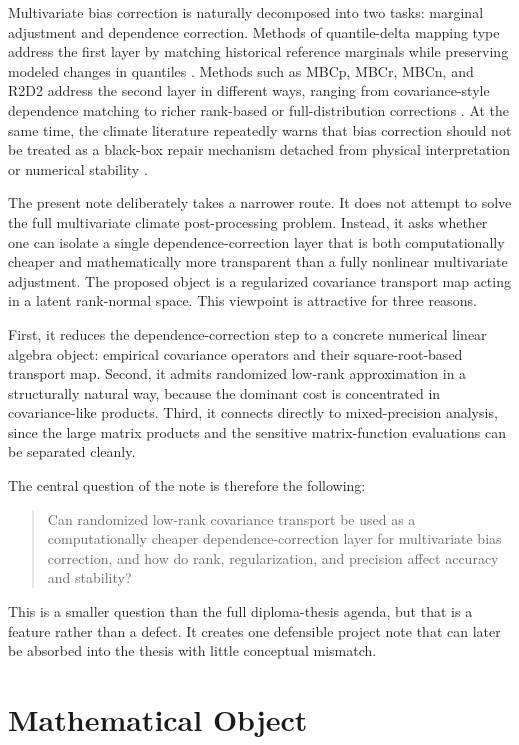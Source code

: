 \documentclass[12pt,a4paper]{article}
\begin{document}
Multivariate bias correction is naturally decomposed into two tasks: marginal adjustment and dependence correction. Methods of quantile-delta mapping type address the first layer by matching historical reference marginals while preserving modeled changes in quantiles \cite{cannon2015qdm}. Methods such as MBCp, MBCr, MBCn, and R2D2 address the second layer in different ways, ranging from covariance-style dependence matching to richer rank-based or full-distribution corrections \cite{cannon2016mbc,cannon2018mbcn,vrac2018r2d2}. At the same time, the climate literature repeatedly warns that bias correction should not be treated as a black-box repair mechanism detached from physical interpretation or numerical stability \cite{maraun2016biasreview}.

The present note deliberately takes a narrower route. It does not attempt to solve the full multivariate climate post-processing problem. Instead, it asks whether one can isolate a single dependence-correction layer that is both computationally cheaper and mathematically more transparent than a fully nonlinear multivariate adjustment. The proposed object is a regularized covariance transport map acting in a latent rank-normal space. This viewpoint is attractive for three reasons.

First, it reduces the dependence-correction step to a concrete numerical linear algebra object: empirical covariance operators and their square-root-based transport map. Second, it admits randomized low-rank approximation in a structurally natural way, because the dominant cost is concentrated in covariance-like products. Third, it connects directly to mixed-precision analysis, since the large matrix products and the sensitive matrix-function evaluations can be separated cleanly.

The central question of the note is therefore the following:
\begin{quote}
	Can randomized low-rank covariance transport be used as a computationally cheaper dependence-correction layer for multivariate bias correction, and how do rank, regularization, and precision affect accuracy and stability?
\end{quote}

This is a smaller question than the full diploma-thesis agenda, but that is a feature rather than a defect. It creates one defensible project note that can later be absorbed into the thesis with little conceptual mismatch.

\section{Mathematical Object}
\end{document}
